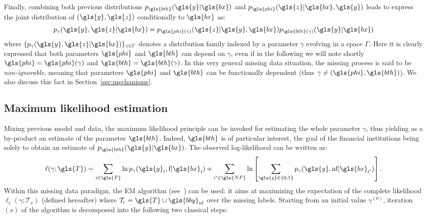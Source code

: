 Finally, combining both previous distributions $p_{\gls{bth}}(\gls{y}|\gls{bx})$ and $p_{\gls{phi}}(\gls{z}|\gls{bx},\gls{y})$ leads to express the joint distribution of $(\gls{y},\gls{z})$ conditionally to $\gls{bx}$ as:
\begin{equation}\label{eq:generative}
p_{\gamma}(\gls{y},\gls{z}|\gls{bx}) = p_{\gls{phi}(\gamma)}(\gls{z}|\gls{y},\gls{bx})p_{\gls{bth}(\gamma)}(\gls{y}|\gls{bx})
\end{equation}
where $\{p_{\gamma}(\gls{y},\gls{z}|\gls{bx})\}_{\gamma \in \Gamma}$ denotes a distribution family indexed by a parameter $\gamma$ evolving in a space $\Gamma$. Here it is clearly expressed that both parameters $\gls{phi}$ and $\gls{bth}$ can depend on $\gamma$, even if in the following we will note shortly $\gls{phi}=\gls{phi}(\gamma)$ and $\gls{bth}=\gls{bth}(\gamma)$. In this very general missing data situation, the missing process is said to be {\it non-ignorable}, meaning that parameters $\gls{phi}$ and $\gls{bth}$ can be functionally dependent (thus $\gamma\neq (\gls{phi},\gls{bth})$). We also discuss this fact in Section~\ref{sec:mechanisms}.

\subsection{Maximum likelihood estimation} 
\label{sec:EM}

Mixing previous model and data, the maximum likelihood principle can be invoked for estimating the whole parameter $\gamma$, thus yielding as a by-product an estimate of the parameter $\gls{bth}$. Indeed, $\gls{bth}$ is of particular interest, the goal of the financial institutions being solely to obtain an estimate of $p_{\gls{bth}}(\gls{y}|\gls{bx})$. The observed log-likelihood can be written as:
\begin{equation}\label{eq:like.MNAR}
\ell(\gamma;\gls{T}) = \sum_{i\in\gls{F}}\ln p_{\gamma}(\gls{y}_i,\text{f} | \gls{bx}_i) + \sum_{i'\in\gls{NF}} \ln \left[ \sum_{\gls{y}\in\{0,1\}} p_{\gamma}(\gls{y},\text{nf} | \gls{bx}_{i'}) \right].
\end{equation}
Within this missing data paradigm, the EM algorithm (see~\cite{dempster1977maximum}) can be used: it aims at maximizing the expectation of the complete likelihood $\ell_c(\gamma;\mathcal{T}_{\text{c}})$ (defined hereafter) where $\mathcal{T}_{\text{c}} = \gls{T} \cup \gls{bby}_{\text{nf}}$ over the missing labels. Starting from an initial value $\gamma^{(0)}$, iteration $(s)$ of the algorithm is decomposed into the following two classical steps:
